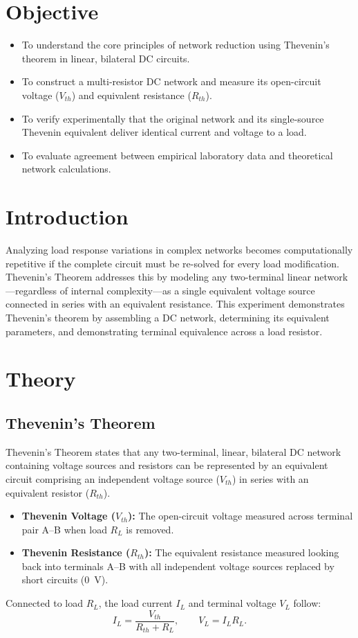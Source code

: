 \section{Objective}
\begin{itemize}
	\item To understand the core principles of network reduction using Thevenin's theorem in linear, bilateral DC circuits.
	\item To construct a multi-resistor DC network and measure its open-circuit voltage ($V_{th}$) and equivalent resistance ($R_{th}$).
	\item To verify experimentally that the original network and its single-source Thevenin equivalent deliver identical current and voltage to a load.
	\item To evaluate agreement between empirical laboratory data and theoretical network calculations.
\end{itemize}

\section{Introduction}
Analyzing load response variations in complex networks becomes computationally repetitive if the complete circuit must be re-solved for every load modification. Thevenin's Theorem addresses this by modeling any two-terminal linear network—regardless of internal complexity—as a single equivalent voltage source connected in series with an equivalent resistance. This experiment demonstrates Thevenin's theorem by assembling a DC network, determining its equivalent parameters, and demonstrating terminal equivalence across a load resistor.

\section{Theory}

\subsection{Thevenin's Theorem}
Thevenin's Theorem states that any two-terminal, linear, bilateral DC network containing voltage sources and resistors can be represented by an equivalent circuit comprising an independent voltage source ($V_{th}$) in series with an equivalent resistor ($R_{th}$).
\begin{itemize}
	\item \textbf{Thevenin Voltage ($V_{th}$):} The open-circuit voltage measured across terminal pair A--B when load $R_L$ is removed.
	\item \textbf{Thevenin Resistance ($R_{th}$):} The equivalent resistance measured looking back into terminals A--B with all independent voltage sources replaced by short circuits (\qty{0}{\volt}).
\end{itemize}
Connected to load $R_L$, the load current $I_L$ and terminal voltage $V_L$ follow:
\[
I_L = \frac{V_{th}}{R_{th}+R_L}, \qquad V_L = I_L R_L.
\]

